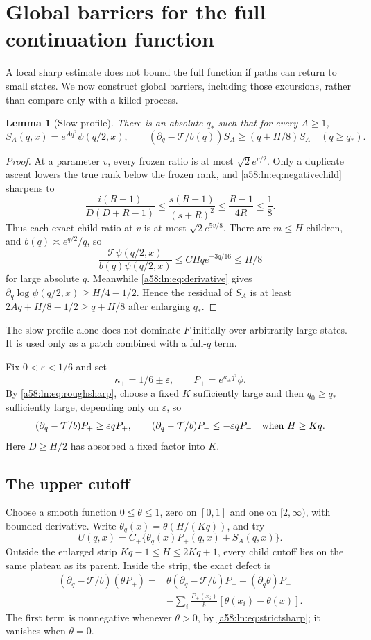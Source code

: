 \documentclass[11pt,letterpaper]{article}
\newtheorem{lemma}[theorem]{Lemma}
\theoremstyle{remark}
\newcommand{\TT}{\mathcal T}
\begin{document}
\section{Global barriers for the full continuation function}\label{a58:ln:sec:global}
A local sharp estimate does not bound the full function if paths can
return to small states. We now construct global barriers, including those
excursions, rather than compare only with a killed process.

\begin{lemma}[Slow profile]\label{a58:ln:lem:slow}
There is an absolute $q_*$ such that for every $A\ge1$,
\[
 S_A(q,x)=e^{Aq^2}\psi(q/2,x),\qquad
 (\partial_q-\TT/b(q))S_A\ge(q+H/8)S_A\quad(q\ge q_*).
\]
\end{lemma}
\begin{proof}
At a parameter $v$, every frozen ratio is at most $\sqrt2e^{v/2}$.
Only a duplicate ascent lowers the true rank below the frozen rank, and
\eqref{a58:ln:eq:negativechild} sharpens to
\[
 \frac{i(R-1)}{D(D+R-1)}
 \le\frac{s(R-1)}{(s+R)^2}\le\frac{R-1}{4R}\le\frac18.
\]
Thus each exact child ratio at $v$ is at most $\sqrt2e^{5v/8}$.
There are $m\le H$ children, and $b(q)\asymp e^{q/2}/q$, so
\[
 \frac{\TT\psi(q/2,x)}{b(q)\psi(q/2,x)}
 \le CHq e^{-3q/16}\le H/8
\]
for large absolute $q$. Meanwhile \eqref{a58:ln:eq:derivative} gives
$\partial_q\log\psi(q/2,x)\ge H/4-1/2$. Hence the residual of
$S_A$ is at least $2Aq+H/8-1/2\ge q+H/8$ after enlarging $q_*$.
\end{proof}
The slow profile alone does not dominate $F$ initially over arbitrarily
large states. It is used only as a patch combined with a full-$q$ term.

Fix $0<\varepsilon<1/6$ and set
\[
 \kappa_\pm=1/6\pm\varepsilon,\qquad
 P_\pm=e^{\kappa_\pm q^2}\phi.
\]
By \eqref{a58:ln:eq:roughsharp}, choose a fixed $K$ sufficiently large and then
$q_0\ge q_*$ sufficiently large, depending only on $\varepsilon$, so
\begin{equation}\label{a58:ln:eq:strictsharp}
 (\partial_q-\TT/b)P_+\ge\varepsilon qP_+,
 \qquad (\partial_q-\TT/b)P_-\le-\varepsilon qP_-
 \quad\hbox{when }H\ge Kq.
\end{equation}
Here $D\ge H/2$ has absorbed a fixed factor into $K$.

\subsection{The upper cutoff}
Choose a smooth function $0\le\theta\le1$, zero on $[0,1]$ and one
on $[2,\infty)$, with bounded derivative. Write
$\theta_q(x)=\theta(H/(Kq))$, and try
\[
 U(q,x)=C_+\{\theta_q(x)P_+(q,x)+S_A(q,x)\}.
\]
Outside the enlarged strip $Kq-1\le H\le2Kq+1$, every child cutoff lies
on the same plateau as its parent. Inside the strip, the exact defect is
\begin{align*}
 (\partial_q-\TT/b)(\theta P_+)
 ={}&\theta(\partial_q-\TT/b)P_+
 +(\partial_q\theta)P_+\\
 &-\sum_i\frac{P_+(x_i)}b[\theta(x_i)-\theta(x)].
\end{align*}
The first term is nonnegative whenever $\theta>0$, by
\eqref{a58:ln:eq:strictsharp}; it vanishes when $\theta=0$.
\end{document}
